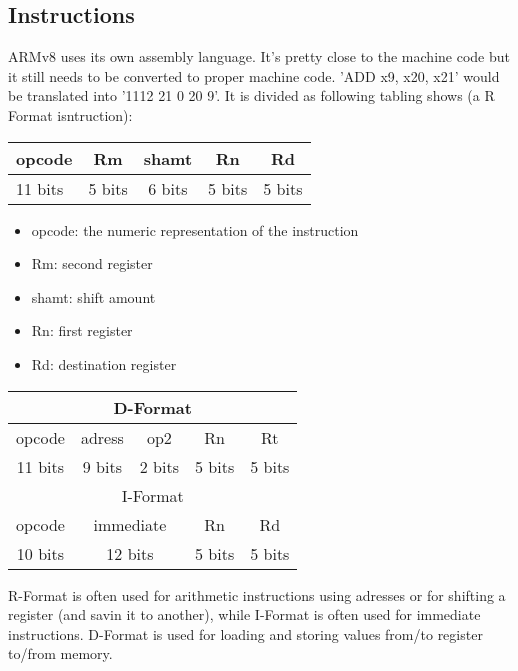 \documentclass[a4paper]{scrartcl}
\begin{document}
        \subsection{Instructions}
            ARMv8 uses its own assembly language. It's pretty close to the machine code but it still needs to be converted to proper machine code. 'ADD x9, x20, x21'
            would be translated into '1112 21 0 20 9'. It is divided as following tabling shows (a R Format isntruction): 
            \begin{center}
            \begin{tabular}{|p{5cm}|c|c|c|c|}
                \hline
                opcode & Rm & shamt & Rn & Rd \\
                \hline
                11 bits & 5 bits & 6 bits & 5 bits & 5 bits \\ 
                \hline
            \end{tabular}
            \end{center}
            
            \begin{itemize}
                \item opcode: the numeric representation of the instruction
                \item Rm: second register
                \item shamt: shift amount
                \item Rn: first register
                \item Rd: destination register
            \end{itemize}
        

            \begin{center}
                \begin{tabular}{|c|c|c|c|c|}
                    \hline
                    \multicolumn{5}{|c|}{D-Format} \\
                    \hline
                    opcode & adress & op2 & Rn & Rt \\
                    \hline
                    11 bits & 9 bits & 2 bits & 5 bits & 5 bits \\
                    \hline \hline
                    \multicolumn{5}{|c|}{I-Format} \\
                    \hline
                    opcode & \multicolumn{2}{|c|}{immediate}  & Rn & Rd \\
                    \hline
                    10 bits & \multicolumn{2}{|c|}{12 bits} & 5 bits & 5 bits \\
                    \hline
                \end{tabular}
            \end{center}
            R-Format is often used for arithmetic instructions using adresses or for shifting a register (and savin it to another),
            while I-Format is often used for immediate instructions. D-Format is used for loading and storing values from/to register to/from memory.
\end{document}
